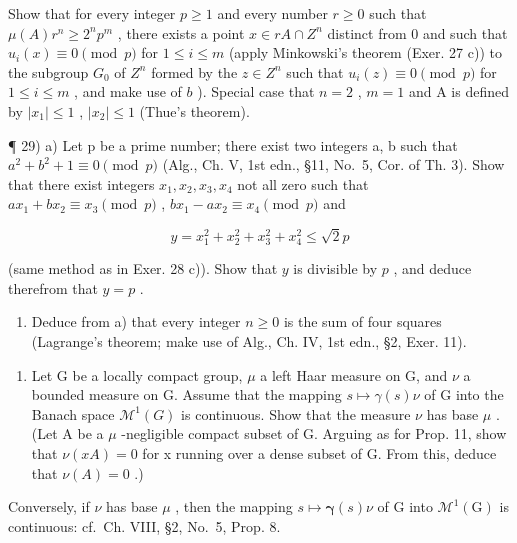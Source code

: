 Show that for every integer \(p \geqslant 1\) and every number \(r \geqslant 0\) such that \(\mu(A)r^n \geqslant 2^n p^m\) , there exists a point \(x \in rA \cap Z^n\) distinct from 0 and such that \(u_i(x) \equiv 0 \pmod{p}\) for \(1 \leqslant i \leqslant m\) (apply Minkowski's theorem (Exer. 27 c)) to the subgroup \(G_0\) of \(Z^n\) formed by the \(z \in Z^n\) such that \(u_i(z) \equiv 0 \pmod{p}\) for \(1 \leqslant i \leqslant m\) , and make use of \(b\) ). Special case that \(n = 2\) , \(m = 1\) and A is defined by \(|x_1| \leqslant 1\) , \(|x_2| \leqslant 1\) (Thue's theorem).

¶ 29) a) Let p be a prime number; there exist two integers a, b such that \(a^{2}+b^{2}+1 \equiv 0 \pmod{p}\) (Alg., Ch. V, 1st edn., §11, No.~5, Cor. of Th. 3). Show that there exist integers \(x_{1}, x_{2}, x_{3}, x_{4}\) not all zero such that \(ax_{1} + bx_{2} \equiv x_{3} \pmod{p}\) , \(bx_{1} - ax_{2} \equiv x_{4} \pmod{p}\) and

\[
y = x _ {1} ^ {2} + x _ {2} ^ {2} + x _ {3} ^ {2} + x _ {4} ^ {2} \leqslant \sqrt {2} p
\]

(same method as in Exer. 28 c)). Show that \(y\) is divisible by \(p\) , and deduce therefrom that \(y = p\) .

\begin{enumerate}
\def\labelenumi{\alph{enumi})}
\setcounter{enumi}{1}
\tightlist
\item
  Deduce from a) that every integer \(n \geqslant 0\) is the sum of four squares (Lagrange's theorem; make use of Alg., Ch. IV, 1st edn., §2, Exer. 11).
\end{enumerate}

\begin{enumerate}
\def\labelenumi{\arabic{enumi})}
\setcounter{enumi}{29}
\tightlist
\item
  Let G be a locally compact group, \(\mu\) a left Haar measure on G, and \(\nu\) a bounded measure on G. Assume that the mapping \(s \mapsto \gamma(s)\nu\) of G into the Banach space \(\mathcal{M}^{1}(G)\) is continuous. Show that the measure \(\nu\) has base \(\mu\) . (Let A be a \(\mu\) -negligible compact subset of G. Arguing as for Prop. 11, show that \(\nu(xA)=0\) for x running over a dense subset of G. From this, deduce that \(\nu(A)=0\) .)
\end{enumerate}

Conversely, if \(\nu\) has base \(\mu\) , then the mapping \(s \mapsto \pmb{\gamma}(s)\nu\) of G into \(\mathcal{M}^1(\mathrm{G})\) is continuous: cf.~Ch. VIII, §2, No.~5, Prop. 8.
